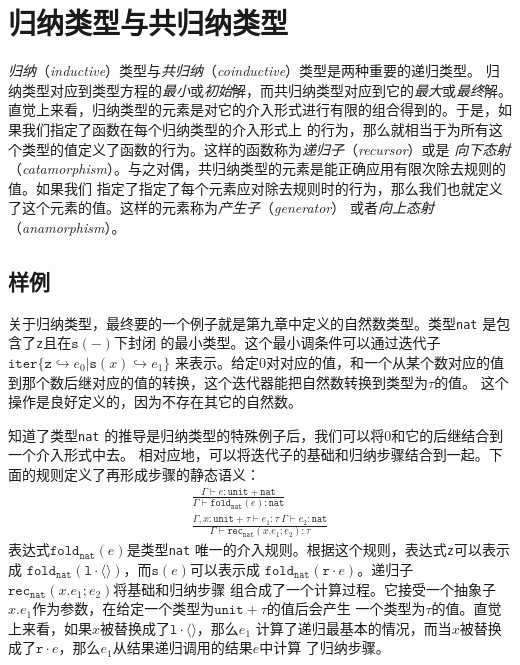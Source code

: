 \chapter{归纳类型与共归纳类型}

\textit{归纳}（\textit{inductive}）类型与\textit{共归纳}（\textit{coinductive}）类型是两种重要的递归类型。
归纳类型对应到类型方程的\textit{最小}或\textit{初始}解，而共归纳类型对应到它的\textit{最大}或\textit{最终}解。
直觉上来看，归纳类型的元素是对它的介入形式进行有限的组合得到的。于是，如果我们指定了函数在每个归纳类型的介入形式上
的行为，那么就相当于为所有这个类型的值定义了函数的行为。这样的函数称为\textit{递归子}（\textit{recursor}）或是
\textit{向下态射}（\textit{catamorphism}）。与之对偶，共归纳类型的元素是能正确应用有限次除去规则的值。如果我们
指定了指定了每个元素应对除去规则时的行为，那么我们也就定义了这个元素的值。这样的元素称为\textit{产生子}（\textit{generator}）
或者\textit{向上态射}（\textit{anamorphism}）。

\section{样例}

关于归纳类型，最终要的一个例子就是第九章中定义的自然数类型。类型\texttt{nat} 是包含了\texttt{z}且在$\texttt{s}(-)$下封闭
的最小类型。这个最小调条件可以通过迭代子$\texttt{iter} \{\texttt{z}\hookrightarrow e_0|\texttt{s}(x)\hookrightarrow e_1\}$
来表示。给定0对对应的值，和一个从某个数对应的值到那个数后继对应的值的转换，这个迭代器能把自然数转换到类型为$\tau$的值。
这个操作是良好定义的，因为不存在其它的自然数。

知道了类型\texttt{nat} 的推导是归纳类型的特殊例子后，我们可以将0和它的后继结合到一个介入形式中去。
相对应地，可以将迭代子的基础和归纳步骤结合到一起。下面的规则定义了再形成步骤的静态语义：
\begin{subequations}
	\begin{gather}
	\frac{\Gamma\vdash e:\texttt{unit} +\texttt{nat}}{\Gamma\vdash\texttt{fold}_\texttt{nat}(e):\texttt{nat}} \\
	\frac{\Gamma,x:\texttt{unit} + \tau\vdash e_1:\tau\ \Gamma\vdash e_2:\texttt{nat}}{\Gamma\vdash\texttt{rec}_\texttt{nat}(x.e_1;e_2):\tau}
	\end{gather}
\end{subequations}
表达式$\texttt{fold}_\texttt{nat}(e)$是类型\texttt{nat} 唯一的介入规则。根据这个规则，表达式\texttt{z}可以表示成
$\texttt{fold}_\texttt{nat}(\texttt{l}\cdot\langle\rangle)$，而$\texttt{s}(e)$可以表示成
$\texttt{fold}_\texttt{nat}(\texttt{r}\cdot e)$。递归子$\texttt{rec}_\texttt{nat}(x.e_1;e_2)$将基础和归纳步骤
组合成了一个计算过程。它接受一个抽象子$x.e_1$作为参数，在给定一个类型为$\texttt{unit} +\tau$的值后会产生
一个类型为$\tau$的值。直觉上来看，如果$x$被替换成了$\texttt{l}\cdot\langle\rangle$，那么$e_1$
计算了递归最基本的情况，而当$x$被替换成了$\texttt{r}\cdot e$，那么$e_1$从结果递归调用的结果$e$中计算
了归纳步骤。

